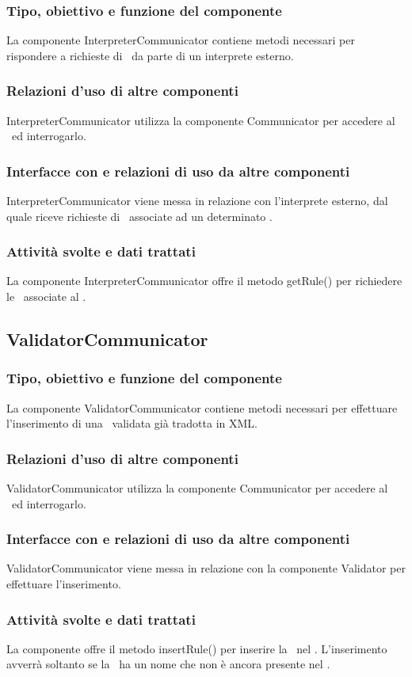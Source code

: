 \subsubsection{Tipo, obiettivo e funzione del componente}
La componente InterpreterCommunicator contiene metodi necessari per rispondere a richieste di \br\ da parte di un interprete esterno.
\subsubsection{Relazioni d'uso di altre componenti}
InterpreterCommunicator utilizza la componente Communicator per accedere al \rp\ ed interrogarlo.
\subsubsection{Interfacce con e relazioni di uso da altre componenti}
InterpreterCommunicator viene messa in relazione con l'interprete esterno, dal quale riceve richieste di \brs\ associate ad un determinato \bo.
\subsubsection{Attivit\`a svolte e dati trattati}
La componente InterpreterCommunicator offre il metodo getRule() per richiedere le \br\ associate al \bo.

\subsection{ValidatorCommunicator}
\subsubsection{Tipo, obiettivo e funzione del componente}
La componente ValidatorCommunicator contiene metodi necessari per effettuare l'inserimento di una \br\ validata gi\`a tradotta in XML.
\subsubsection{Relazioni d'uso di altre componenti}
ValidatorCommunicator utilizza la componente Communicator per accedere al \rp\ ed interrogarlo.
\subsubsection{Interfacce con e relazioni di uso da altre componenti}
ValidatorCommunicator viene messa in relazione con la componente Validator per effettuare l'inserimento.
\subsubsection{Attivit\`a svolte e dati trattati}
La componente offre il metodo insertRule() per inserire la \br\ nel \rp. L'inserimento avverr\`a soltanto se la \br\ ha un nome che non \`e ancora presente nel \rp.

